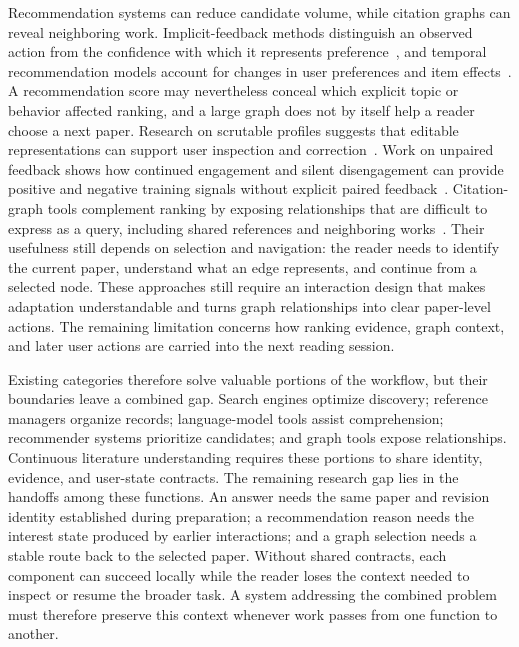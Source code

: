 Recommendation systems can reduce candidate volume, while citation graphs can reveal neighboring work.
Implicit-feedback methods distinguish an observed action from the confidence with which it represents preference~\cite{hu2008implicit}, and temporal recommendation models account for changes in user preferences and item effects~\cite{koren2009temporal}.
A recommendation score may nevertheless conceal which explicit topic or behavior affected ranking, and a large graph does not by itself help a reader choose a next paper.
Research on scrutable profiles suggests that editable representations can support user inspection and correction~\cite{ramos2024scrutable}. Work on unpaired feedback shows how continued engagement and silent disengagement can provide positive and negative training signals without explicit paired feedback~\cite{zhang2025unpaired}.
Citation-graph tools complement ranking by exposing relationships that are difficult to express as a query, including shared references and neighboring works~\cite{connectedPapersAbout2026}.
Their usefulness still depends on selection and navigation: the reader needs to identify the current paper, understand what an edge represents, and continue from a selected node.
These approaches still require an interaction design that makes adaptation understandable and turns graph relationships into clear paper-level actions.
The remaining limitation concerns how ranking evidence, graph context, and later user actions are carried into the next reading session.

Existing categories therefore solve valuable portions of the workflow, but their boundaries leave a combined gap.
Search engines optimize discovery; reference managers organize records; language-model tools assist comprehension; recommender systems prioritize candidates; and graph tools expose relationships.
Continuous literature understanding requires these portions to share identity, evidence, and user-state contracts.
The remaining research gap lies in the handoffs among these functions.
An answer needs the same paper and revision identity established during preparation; a recommendation reason needs the interest state produced by earlier interactions; and a graph selection needs a stable route back to the selected paper.
Without shared contracts, each component can succeed locally while the reader loses the context needed to inspect or resume the broader task.
A system addressing the combined problem must therefore preserve this context whenever work passes from one function to another.

